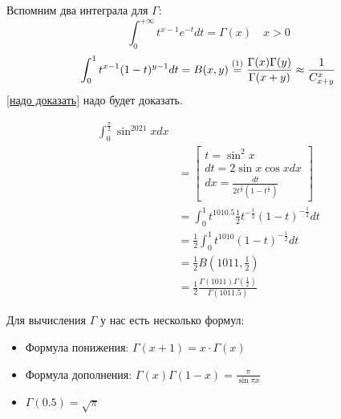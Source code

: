 

\cfoot{}



Вспомним два интеграла для \(\Gamma\):
\[\int_0^{+\infty} t^{x - 1} e^{ - t} dt = \Gamma(x) \quad x > 0\]
\[\int_0^1 t^{x - 1} (1 - t)^{y - 1} dt = B(x, y) \symrefeq{надо доказать} \frac{\Gamma(x)\Gamma(y)}{\Gamma(x + y)} \approx \frac{1}{C^x_{x + y}}\]
\ref{надо доказать} надо будет доказать.

\begin{example}
    \begin{align*}
        \int_0^{\frac{\pi}{2}} \sin^{2021} x dx                                                                                                                         \\
         & = \begin{bmatrix} t = \sin^2 x \\ dt = 2 \sin x \cos x dx  \\ dx = \frac{dt}{2t^{\frac{1}{2}} (1 - t^{\frac{1}{2}})}\end{bmatrix} \\
         & = \int_0^1 t^{1010.5} \frac{1}{2} t^{ - \frac{1}{2}} (1 - t)^{ - \frac{1}{2}} dt                                                                             \\
         & = \frac{1}{2}\int_0^1 t^{1010} (1 - t)^{ - \frac{1}{2}}dt                                                                                                    \\
         & = \frac{1}{2}B(1011, \frac{1}{2})                                                                                                                            \\
         & = \frac{1}{2} \frac{\Gamma(1011)\Gamma(\frac{1}{2})}{\Gamma(1011.5)}
    \end{align*}
\end{example}

Для вычисления \(\Gamma\) у нас есть несколько формул:
\begin{itemize}
    \item Формула понижения: \(\Gamma(x + 1) = x \cdot \Gamma(x)\)
    \item Формула дополнения: \(\Gamma(x)\Gamma(1 - x) = \frac{\pi}{\sin \pi x}\)
    \item \(\Gamma(0.5) = \sqrt{\pi}\)
\end{itemize}

